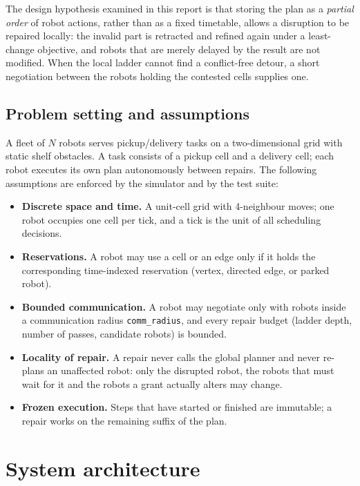 \documentclass[10pt,a4paper]{article}
\newcommand{\code}[1]{\texttt{#1}}
\begin{document}
The design hypothesis examined in this report is that storing the plan as a
\emph{partial order} of robot actions, rather than as a fixed timetable,
allows a disruption to be repaired locally: the invalid part is retracted and
refined again under a least-change objective, and robots that are merely
delayed by the result are not modified.  When the local ladder cannot find a
conflict-free detour, a short negotiation between the robots holding the
contested cells supplies one.

\subsection{Problem setting and assumptions}

A fleet of $N$ robots serves pickup/delivery tasks on a two-dimensional grid
with static shelf obstacles.  A task consists of a pickup cell and a delivery
cell; each robot executes its own plan autonomously between repairs.  The
following assumptions are enforced by the simulator and by the test suite:

\begin{itemize}
  \item \textbf{Discrete space and time.}  A unit-cell grid with 4-neighbour
        moves; one robot occupies one cell per tick, and a tick is the unit of
        all scheduling decisions.
  \item \textbf{Reservations.}  A robot may use a cell or an edge only if it
        holds the corresponding time-indexed reservation (vertex, directed
        edge, or parked robot).
  \item \textbf{Bounded communication.}  A robot may negotiate only with
        robots inside a communication radius \code{comm\_radius}, and every
        repair budget (ladder depth, number of passes, candidate robots) is
        bounded.
  \item \textbf{Locality of repair.}  A repair never calls the global planner
        and never re-plans an unaffected robot: only the disrupted robot, the
        robots that must wait for it and the robots a grant actually alters
        may change.
  \item \textbf{Frozen execution.}  Steps that have started or finished are
        immutable; a repair works on the remaining suffix of the plan.
\end{itemize}
\section{System architecture}\label{sec:arch}
\end{document}
